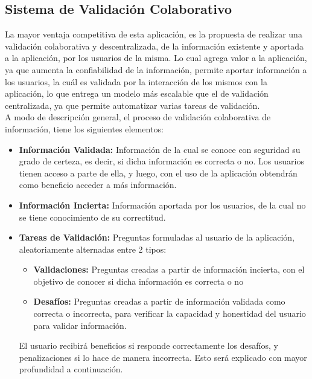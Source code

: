 \documentclass[10pt,letterpaper]{article}
\begin{document}
\newpage
\subsection{Sistema de Validación Colaborativo}

La mayor ventaja competitiva de esta aplicación, es la propuesta de realizar una validación colaborativa y descentralizada, de la información existente y aportada a la aplicación, por los usuarios de la misma. Lo cual agrega valor a la aplicación, ya que aumenta la confiabilidad de la información, permite aportar información a los usuarios, la cuál es validada por la interacción de los mismos con la aplicación, lo que entrega un modelo más escalable que el de validación centralizada, ya que permite automatizar varias tareas de validación.\\

A modo de descripción general, el proceso de validación colaborativa de información, tiene los siguientes elementos:\\

\begin{itemize}
 \item \textbf{Información Validada:} Información de la cual se conoce con seguridad su grado de certeza, es decir, si dicha información es correcta o no. Los usuarios tienen acceso a parte de ella, y luego, con el uso de la aplicación obtendrán como beneficio acceder a más información.
 \item \textbf{Información Incierta:} Información aportada por los usuarios, de la cual no se tiene conocimiento de su correctitud.
 \item \textbf{Tareas de Validación:} Preguntas formuladas al usuario de la aplicación, aleatoriamente alternadas entre 2 tipos:
  \begin{itemize}
   \item \textbf{Validaciones:} Preguntas creadas a partir de información incierta, con el objetivo de conocer si dicha información es correcta o no
   \item \textbf{Desafíos:} Preguntas creadas a partir de información validada como correcta o incorrecta, para verificar la capacidad y honestidad del usuario para validar información.
  \end{itemize}
  El usuario recibirá beneficios si responde correctamente los desafíos, y penalizaciones si lo hace de manera incorrecta. Esto será explicado con mayor profundidad a continuación.
\end{itemize}
  
\end{document}
